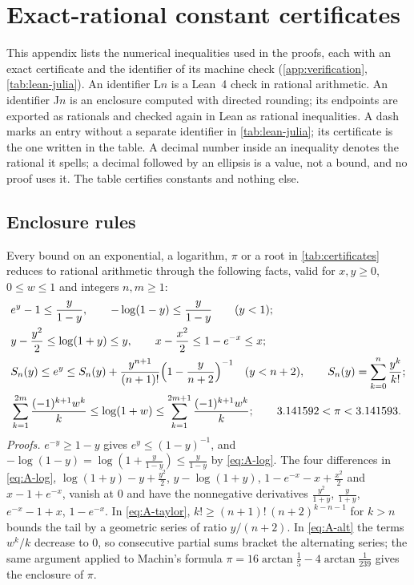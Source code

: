 \documentclass[11pt,a4paper]{amsart}
\theoremstyle{definition}
\theoremstyle{remark}
\numberwithin{equation}{section}
\begin{document}
\appendix
\section{Exact-rational constant certificates}\label{app:certificates}

This appendix lists the numerical inequalities used in the proofs, each with an exact certificate and the identifier of its machine check (\cref{app:verification}, \cref{tab:lean-julia}). An identifier L$n$ is a Lean~4 check in rational arithmetic. An identifier J$n$ is an enclosure computed with directed rounding; its endpoints are exported as rationals and checked again in Lean as rational inequalities. A dash marks an entry without a separate identifier in \cref{tab:lean-julia}; its certificate is the one written in the table. A decimal number inside an inequality denotes the rational it spells; a decimal followed by an ellipsis is a value, not a bound, and no proof uses it. The table certifies constants and nothing else.

\subsection{Enclosure rules}
Every bound on an exponential, a logarithm, $\pi$ or a root in \cref{tab:certificates} reduces to rational arithmetic through the following facts, valid for $x,y\ge0$, $0\le w\le1$ and integers $n,m\ge1$:
\begin{align}
&e^{y}-1\le\frac{y}{1-y},\qquad -\log(1-y)\le\frac{y}{1-y}\qquad(y<1);\label{eq:A-expm1}\\
&y-\frac{y^2}{2}\le\log(1+y)\le y,\qquad x-\frac{x^2}{2}\le1-e^{-x}\le x;\label{eq:A-log}\\
&S_n(y)\le e^{y}\le S_n(y)+\frac{y^{n+1}}{(n+1)!}\Bigl(1-\frac{y}{n+2}\Bigr)^{-1}\quad(y<n+2),\qquad S_n(y)=\sum_{k=0}^{n}\frac{y^k}{k!};\label{eq:A-taylor}\\
&\sum_{k=1}^{2m}\frac{(-1)^{k+1}w^k}{k}\le\log(1+w)\le\sum_{k=1}^{2m+1}\frac{(-1)^{k+1}w^k}{k};\qquad 3.141592<\pi<3.141593.\label{eq:A-alt}
\end{align}
\emph{Proofs.} $e^{-y}\ge1-y$ gives $e^{y}\le(1-y)^{-1}$, and $-\log(1-y)=\log(1+\frac{y}{1-y})\le\frac{y}{1-y}$ by \eqref{eq:A-log}. The four differences in \eqref{eq:A-log}, $\log(1+y)-y+\frac{y^2}2$, $y-\log(1+y)$, $1-e^{-x}-x+\frac{x^2}2$ and $x-1+e^{-x}$, vanish at $0$ and have the nonnegative derivatives $\frac{y^2}{1+y}$, $\frac{y}{1+y}$, $e^{-x}-1+x$, $1-e^{-x}$. In \eqref{eq:A-taylor}, $k!\ge(n+1)!\,(n+2)^{k-n-1}$ for $k>n$ bounds the tail by a geometric series of ratio $y/(n+2)$. In \eqref{eq:A-alt} the terms $w^k/k$ decrease to $0$, so consecutive partial sums bracket the alternating series; the same argument applied to Machin's formula $\pi=16\arctan\frac15-4\arctan\frac1{239}$ gives the enclosure of $\pi$.
\end{document}
